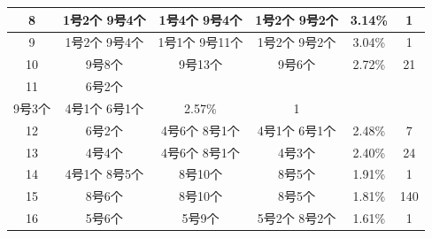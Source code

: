 \documentclass{article}
\begin{document}
\begin{table}[!h]
\begin{longtable}{|c|c|c|c|c|c|}
			8     & 1号2个 9号4个                                                       & 1号4个 9号4个                                                  & 1号2个 9号2个                                                       & 3.14\% & 1   \\ \hline
			9     & 1号2个 9号4个                                                       & 1号1个 9号11个                                                 & 1号2个 9号2个                                                       & 3.04\% & 1   \\ \hline
			10    & 9号8个                                                            & 9号13个                                                      & 9号6个                                                            & 2.72\% & 21  \\ \hline
			11    & 6号2个                                                            & \begin{tabular}[c]{@{}c@{}}4号1个 6号2个 \\ 9号3个\end{tabular}  & 4号1个 6号1个                                                       & 2.57\% & 1   \\ \hline
			12    & 6号2个                                                            & 4号6个 8号1个                                                  & 4号1个 6号1个                                                       & 2.48\% & 7   \\ \hline
			13    & 4号4个                                                            & 4号6个 8号1个                                                  & 4号3个                                                            & 2.40\% & 24  \\ \hline
			14    & 4号1个 8号5个                                                       & 8号10个                                                      & 8号5个                                                            & 1.91\% & 1   \\ \hline
			15    & 8号6个                                                            & 8号10个                                                      & 8号5个                                                            & 1.81\% & 140 \\ \hline
			16    & 5号6个                                                            & 5号9个                                                       & 5号2个 8号2个                                                       & 1.61\% & 1   \\ \hline

\end{longtable}
\end{table}
\end{document}
